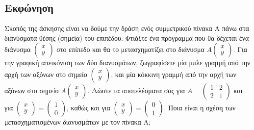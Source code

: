 \documentclass[a4paper,12pt]{article}
\begin{document}
\subsection{Εκφώνηση}
Σκοπός της άσκησης είναι να δούμε την δράση ενός συμμετρικού πίνακα Α πάνω στα
διανύσματα θέσης (σημεία) του επιπέδου. Φτιάξτε ένα πρόγραμμα που θα δέχεται
ένα διάνυσμα $
	\begin{pmatrix}
		x \\
		y
	\end{pmatrix}
$ στο επίπεδο και θα το μετασχηματίζει στο διάνυσμα $
	A
	\begin{pmatrix}
		x \\
		y
	\end{pmatrix}
$. Για την γραφική απεικόνιση των δύο διανυσμάτων, ζωγραφίσετε μία μπλε γραμμή
από την αρχή των αξόνων στο σημείο $
	\begin{pmatrix}
		x \\
		y
	\end{pmatrix}
$, και μία κόκκινη γραμμή από την αρχή των αξόνων στο σημείο $
	A
	\begin{pmatrix}
		x \\
		y
	\end{pmatrix}
$. Δώστε τα αποτελέσματα σας για $
	A=\begin{pmatrix}
		1 & 2 \\
		2 & 1
	\end{pmatrix}
$ και για $
	\begin{pmatrix}
		x \\
		y
	\end{pmatrix}=\begin{pmatrix}
		1 \\
		0
	\end{pmatrix}
$, καθώς και για $
	\begin{pmatrix}
		x \\
		y
	\end{pmatrix}=\begin{pmatrix}
		0 \\
		1
	\end{pmatrix}
$. Ποια είναι η σχέση των μετασχηματισμένων διανυσμάτων με τον πίνακα Α;
\end{document}
